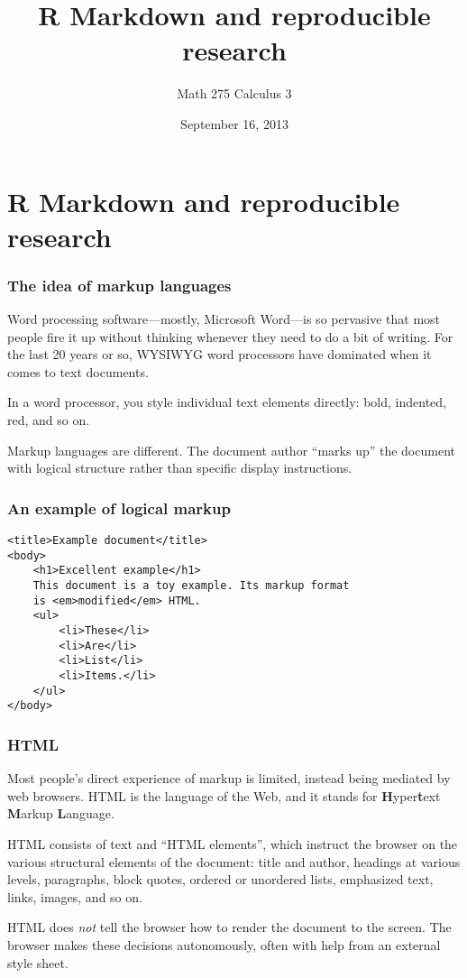 \documentclass[11pt,ignorenonframetext,aspectratio=169]{beamer}
\title{R Markdown and reproducible research}
\author{Math 275 Calculus 3}
\date{September 16, 2013 }
\begin{document}
\frame{\titlepage}

\section{R Markdown and reproducible research}

\begin{frame}\frametitle{The idea of markup languages}

Word processing software---mostly, Microsoft Word---is so pervasive that
most people fire it up without thinking whenever they need to do a bit
of writing. For the last 20 years or so, WYSIWYG word processors have
dominated when it comes to text documents.

In a word processor, you style individual text elements directly: bold,
indented, red, and so on.

Markup languages are different. The document author ``marks up'' the
document with logical structure rather than specific display
instructions.

\end{frame}

\begin{frame}[fragile]\frametitle{An example of logical markup}

\begin{verbatim}
<title>Example document</title>
<body>
    <h1>Excellent example</h1>
    This document is a toy example. Its markup format
    is <em>modified</em> HTML.
    <ul>
        <li>These</li>
        <li>Are</li>
        <li>List</li>
        <li>Items.</li>
    </ul>
</body>
\end{verbatim}

\end{frame}

\begin{frame}\frametitle{HTML}

Most people's direct experience of markup is limited, instead being
mediated by web browsers. HTML is the language of the Web, and it stands
for \textbf{H}yper\textbf{t}ext \textbf{M}arkup \textbf{L}anguage.

HTML consists of text and ``HTML elements'', which instruct the browser
on the various structural elements of the document: title and author,
headings at various levels, paragraphs, block quotes, ordered or
unordered lists, emphasized text, links, images, and so on.

HTML does \emph{not} tell the browser how to render the document to the
screen. The browser makes these decisions autonomously, often with help
from an external style sheet.

\end{frame}
\end{document}
